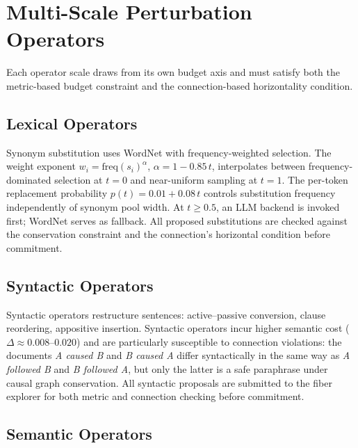 \documentclass[12pt, a4paper]{article}
\theoremstyle{plain}
\theoremstyle{definition}
\theoremstyle{remark}
\begin{document}
\section{Multi-Scale Perturbation Operators}
\label{sec:operators}

Each operator scale draws from its own budget axis and must satisfy both the
metric-based budget constraint and the connection-based horizontality condition.

\subsection{Lexical Operators}

Synonym substitution uses WordNet \cite{miller1995wordnet} with
frequency-weighted selection.  The weight exponent
$w_i = \mathrm{freq}(s_i)^{\alpha}$, $\alpha = 1 - 0.85\,t$,
interpolates between frequency-dominated selection at $t=0$ and near-uniform
sampling at $t=1$.  The per-token replacement probability $p(t) = 0.01 + 0.08\,t$
controls substitution frequency independently of synonym pool width.  At
$t \ge 0.5$, an LLM backend is invoked first; WordNet serves as fallback.
All proposed substitutions are checked against the conservation constraint and
the connection's horizontal condition before commitment.

\subsection{Syntactic Operators}

Syntactic operators restructure sentences: active--passive conversion, clause
reordering, appositive insertion.  Syntactic operators incur higher semantic
cost ($\Delta \approx 0.008$--$0.020$) and are particularly susceptible to
connection violations: the documents \emph{A caused B} and \emph{B caused A}
differ syntactically in the same way as \emph{A followed B} and \emph{B followed A},
but only the latter is a safe paraphrase under causal graph conservation.
All syntactic proposals are submitted to the fiber explorer for both metric
and connection checking before commitment.

\subsection{Semantic Operators}
\end{document}
